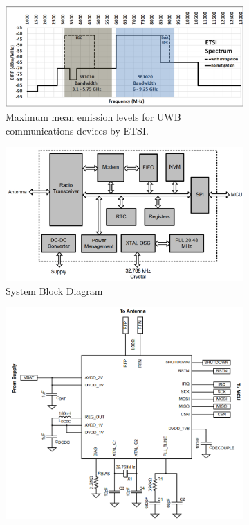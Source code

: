 \begin{figure}
\centering
    \begin{subfigure}[b]{.49\textwidth}
        \centering
        \includegraphics[width=\textwidth]{images/FCC spectrum ETSI.png}
        \caption{Maximum mean emission levels for UWB communications devices by ETSI.}
        \label{fig:spark_ETSI}
    \end{subfigure}
    \hfill
    \centering
    \begin{subfigure}[b]{.49\textwidth}
        \centering
        \includegraphics[width=\textwidth]{images/radio picture datasheet.png}
        \caption{System Block Diagram}
        \label{fig:system_block_diagram}
    \end{subfigure}
    \hfill
    \begin{subfigure}[b]{.7\textwidth}
        \centering
        \includegraphics[width=\textwidth]{images/radio circuit datasheet.png}

\end{subfigure}
\end{figure}
